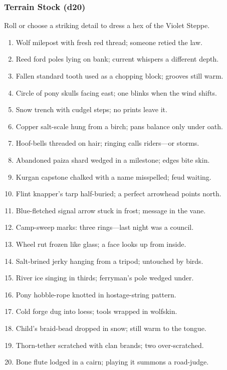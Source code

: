 \subsubsection{Terrain Stock (d20)}
\label{sec:ykrul-terrain-stock}
Roll or choose a striking detail to dress a hex of the Violet Steppe.
\begin{enumerate}
  \item Wolf milepost with fresh red thread; someone retied the law.
  \item Reed ford poles lying on bank; current whispers a different depth.
  \item Fallen standard tooth used as a chopping block; grooves still warm.
  \item Circle of pony skulls facing east; one blinks when the wind shifts.
  \item Snow trench with cudgel steps; no prints leave it.
  \item Copper salt-scale hung from a birch; pans balance only under oath.
  \item Hoof-bells threaded on hair; ringing calls riders---or storms.
  \item Abandoned paiza shard wedged in a milestone; edges bite skin.
  \item Kurgan capstone chalked with a name misspelled; feud waiting.
  \item Flint knapper's tarp half-buried; a perfect arrowhead points north.
  \item Blue-fletched signal arrow stuck in frost; message in the vane.
  \item Camp-sweep marks: three rings---last night was a council.
  \item Wheel rut frozen like glass; a face looks up from inside.
  \item Salt-brined jerky hanging from a tripod; untouched by birds.
  \item River ice singing in thirds; ferryman's pole wedged under.
  \item Pony hobble-rope knotted in hostage-string pattern.
  \item Cold forge dug into loess; tools wrapped in wolfskin.
  \item Child's braid-bead dropped in snow; still warm to the tongue.
  \item Thorn-tether scratched with clan brands; two over-scratched.
  \item Bone flute lodged in a cairn; playing it summons a road-judge.
\end{enumerate}

